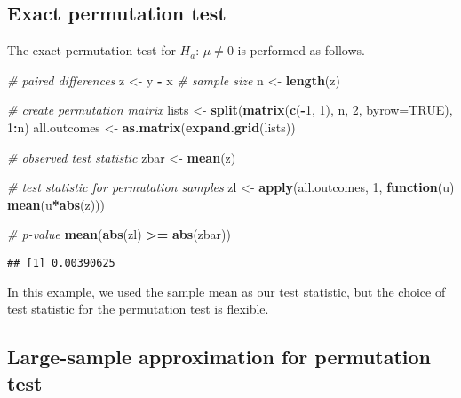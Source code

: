 \documentclass[
]{book}
\newenvironment{Shaded}{\begin{snugshade}}{\end{snugshade}}
\newcommand{\CommentTok}[1]{\textcolor[rgb]{0.56,0.35,0.01}{\textit{#1}}}
\newcommand{\ControlFlowTok}[1]{\textcolor[rgb]{0.13,0.29,0.53}{\textbf{#1}}}
\newcommand{\DataTypeTok}[1]{\textcolor[rgb]{0.13,0.29,0.53}{#1}}
\newcommand{\DecValTok}[1]{\textcolor[rgb]{0.00,0.00,0.81}{#1}}
\newcommand{\KeywordTok}[1]{\textcolor[rgb]{0.13,0.29,0.53}{\textbf{#1}}}
\newcommand{\NormalTok}[1]{#1}
\newcommand{\OperatorTok}[1]{\textcolor[rgb]{0.81,0.36,0.00}{\textbf{#1}}}
\newcommand{\OtherTok}[1]{\textcolor[rgb]{0.56,0.35,0.01}{#1}}
\newcommand{\StringTok}[1]{\textcolor[rgb]{0.31,0.60,0.02}{#1}}
\begin{document}
\hypertarget{exact-permutation-test}{%
\subsection{Exact permutation test}\label{exact-permutation-test}}

The exact permutation test for \(H_a\): \(\mu \neq 0\) is performed as follows.

\begin{Shaded}
\begin{Highlighting}[]
\CommentTok{# paired differences}
\NormalTok{z <-}\StringTok{ }\NormalTok{y }\OperatorTok{-}\StringTok{ }\NormalTok{x}
\CommentTok{# sample size}
\NormalTok{n <-}\StringTok{ }\KeywordTok{length}\NormalTok{(z)}

\CommentTok{# create permutation matrix}
\NormalTok{lists <-}\StringTok{ }\KeywordTok{split}\NormalTok{(}\KeywordTok{matrix}\NormalTok{(}\KeywordTok{c}\NormalTok{(}\OperatorTok{-}\DecValTok{1}\NormalTok{, }\DecValTok{1}\NormalTok{), n, }\DecValTok{2}\NormalTok{, }\DataTypeTok{byrow=}\OtherTok{TRUE}\NormalTok{), }\DecValTok{1}\OperatorTok{:}\NormalTok{n)}
\NormalTok{all.outcomes <-}\StringTok{ }\KeywordTok{as.matrix}\NormalTok{(}\KeywordTok{expand.grid}\NormalTok{(lists))}

\CommentTok{# observed test statistic}
\NormalTok{zbar <-}\StringTok{ }\KeywordTok{mean}\NormalTok{(z)}

\CommentTok{# test statistic for permutation samples}
\NormalTok{zl <-}\StringTok{ }\KeywordTok{apply}\NormalTok{(all.outcomes, }\DecValTok{1}\NormalTok{, }\ControlFlowTok{function}\NormalTok{(u) }\KeywordTok{mean}\NormalTok{(u}\OperatorTok{*}\KeywordTok{abs}\NormalTok{(z)))}

\CommentTok{# p-value}
\KeywordTok{mean}\NormalTok{(}\KeywordTok{abs}\NormalTok{(zl) }\OperatorTok{>=}\StringTok{ }\KeywordTok{abs}\NormalTok{(zbar))}
\end{Highlighting}
\end{Shaded}

\begin{verbatim}
## [1] 0.00390625
\end{verbatim}

In this example, we used the sample mean as our test statistic,
but the choice of test statistic for the permutation test is flexible.

\hypertarget{large-sample-approximation-for-permutation-test}{%
\subsection{Large-sample approximation for permutation test}\label{large-sample-approximation-for-permutation-test}}
\end{document}
